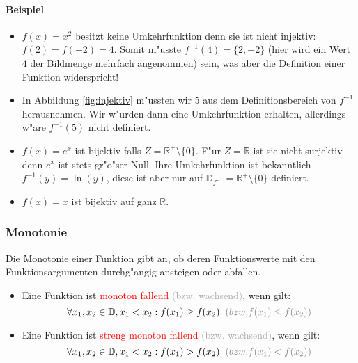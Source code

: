 \paragraph{Beispiel}
\begin{itemize}
\item $f(x) = x^2$ besitzt keine Umkehrfunktion denn sie ist nicht injektiv: $f(2) = f(-2) = 4$. Somit m"usste $f^{-1}(4) = \{2, -2\}$ (hier wird ein Wert $4$ der Bildmenge mehrfach angenommen) sein, was aber die Definition einer Funktion widerspricht!
\item In Abbildung \ref{fig:injektiv} m"ussten wir $5$ aus dem Definitionsbereich von $f^{-1}$ herausnehmen. Wir w"urden dann eine Umkehrfunktion erhalten, allerdings w"are $f^{-1}(5)$ nicht definiert.
\item $f(x) = e^x$ ist bijektiv falls $Z = \mathbb{R}^+  \setminus \{0\}$. F"ur $Z = \mathbb{R}$ ist sie nicht surjektiv denn $e^x$ ist stets gr"o"ser Null. Ihre Umkehrfunktion ist bekanntlich $f^{-1}(y) = \ln(y)$, diese ist aber nur auf $\mathbb{D}_{f^{-1}} =  \mathbb{R}^+ \setminus \{0\}$ definiert.
\item $f(x) = x$ ist bijektiv auf ganz $\mathbb{R}$.
\end{itemize}


\subsubsection{Monotonie}
Die Monotonie einer Funktion gibt an, ob deren Funktionswerte mit den Funktionsargumenten durchg"angig ansteigen oder abfallen.
\begin{itemize}
\item Eine Funktion ist \textcolor{red}{monoton fallend} \textcolor{DarkGrey}{(bzw. wachsend)}, wenn gilt:
\begin{equation*}
\forall x_1, x_2 \in\mathbb{D}, x_1 < x_2: f(x_1)\geq f(x_2) \hspace{0.2 cm}\textcolor{DarkGrey}{(bzw. f(x_1)\leq f(x_2))}
\end{equation*}
\item Eine Funktion ist \textcolor{red}{streng monoton fallend} \textcolor{DarkGrey}{(bzw. wachsend)}, wenn gilt:
\begin{equation*}
\forall x_1, x_2 \in\mathbb{D}, x_1 < x_2: f(x_1)>f(x_2) \hspace{0.2 cm}\textcolor{DarkGrey}{(bzw. f(x_1)<f(x_2))}
\end{equation*}
\end{itemize}

